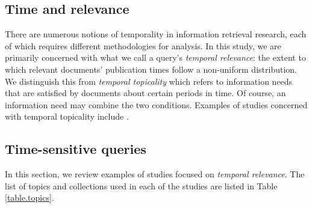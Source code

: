 \documentclass{sig-alternate}
\begin{document}
\subsection{Time and relevance}

There are numerous notions of temporality in information retrieval research, each of which requires different methodologies for analysis. In this study, we are primarily concerned with what we call a query's \emph{temporal relevance}: the extent to which relevant documents' publication times follow a non-uniform distribution. We distinguish this from \emph{temporal topicality} which refers to information needs that are satisfied by documents about certain periods in time. Of course, an information need may combine the two conditions. Examples of studies concerned with temporal topicality include \cite{Berberich2010,Kanhabua2011}.

\subsection{Time-sensitive queries}

In this section, we review examples of studies focused on \emph{temporal relevance}.  The list of topics and collections used in each of the studies are listed in Table \ref{table.topics}. 

\begin{table}
\scriptsize
{}
\caption{TREC topics and Collections Used in Prior Temporal Retrieval Studies.}
\label{table.topics}
\end{table}
\end{document}
